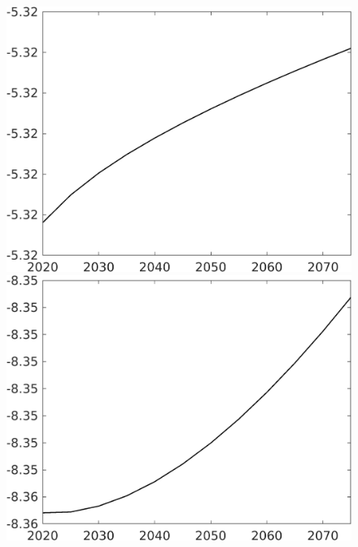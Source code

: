 \documentclass[12pt]{article}
\begin{document}
\begin{figure}[h!!]
\begin{minipage}[]{0.32\textwidth}
	\end{minipage}	
	\begin{minipage}[]{0.32\textwidth}
		\includegraphics[width=1\textwidth]{../../codding_model/own_basedOnFried/optimalPol_010922_revision/figures/all_13Sept22/CompTaul_Equlab_LFBAUPer_Reg0_hl_spillover0_nsk0_xgr0_knspil0_sep1_countec0_GovRev0_etaa0.79.png}
	\end{minipage}	
	\begin{minipage}[]{0.32\textwidth}
		\includegraphics[width=1\textwidth]{../../codding_model/own_basedOnFried/optimalPol_010922_revision/figures/all_13Sept22/CompTaul_Equlab_LFBAUPer_Reg0_C_spillover0_nsk0_xgr0_knspil0_sep1_countec0_GovRev0_etaa0.79.png}

\end{minipage}
\end{figure}
\end{document}
